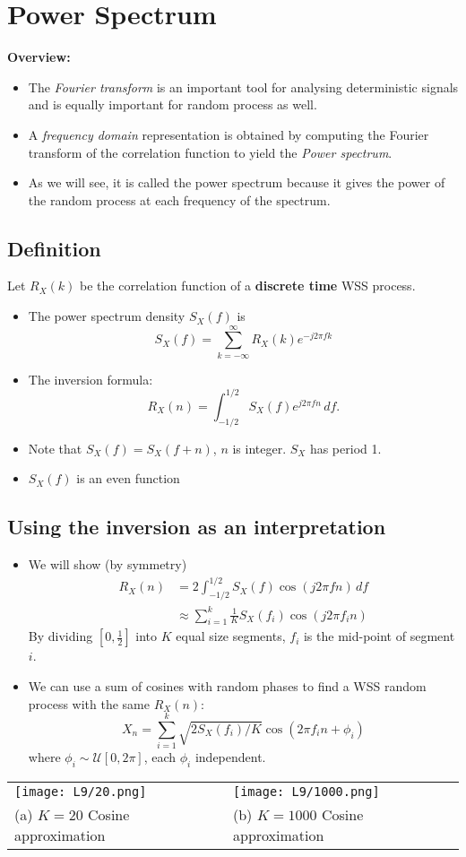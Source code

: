\documentclass[12pt]{article}
\newcommand{\inthalf}{\int_{-1/2}^{1/2}}
\newcommand{\intzerohalf}{\int_{-1/2}^{1/2}}
\newcommand{\summ}[2]{\sum_{#1}^{#2}}
\newcommand{\sumkinfinf}{\summ{k=-\infty}{\infty}}
\newcommand{\psd}{S_X(f)}
\newcommand{\corr}{R_X(k)}
\newcommand{\correlation}[1]{R_X(#1)}
\newcommand{\focoef}[1]{e^{-j2\pi f #1}}
\newcommand{\focoefinv}[1]{e^{j2\pi f #1}}
\begin{document}
\section{Power Spectrum}
\textbf{Overview:}
\begin{itemize}
    \item The \textit{Fourier transform} is an important tool for analysing deterministic signals and is equally important for random process as well.
    \item A \textit{frequency domain} representation is obtained by computing the Fourier transform of the correlation function to yield the \textit{Power spectrum}.
    \item As we will see, it is called the power spectrum because it gives the power of the random process at each frequency of the spectrum.
\end{itemize}
\subsection{Definition}
Let $R_X(k)$ be the correlation function of a \textbf{discrete time} WSS process. 
\begin{itemize}
    \item The power spectrum density $S_X(f)$ is 
\[
S_X(f) =\sumkinfinf \corr \focoef{k}
\]
\item The inversion formula:
\[
\correlation{n} = \inthalf \psd \focoefinv{n} \, df.
\]
\item Note that $\psd = S_X(f+n)$, $n$ is integer. $S_X$ has period 1.
\item $\psd$ is an even function
\end{itemize}
\subsection{Using the inversion as an interpretation}
\begin{itemize}
    \item We will show (by symmetry)
    \begin{align*}
        \correlation{n} &= 2 \intzerohalf \psd \cos(j2\pi f n )\, df \\
        & \approx \summ{i=1}{k}\frac{1}{K}S_X(f_i) \cos(j2\pi f_i n )
    \end{align*}
    By dividing $[0,\frac{1}{2}]$ into $K$ equal size segments, $f_i$ is the mid-point of segment $i$.
    \item We can use a sum of cosines with random phases to find a WSS random process with the same $\correlation{n}$:
    \[
    X_n = \summ{i=1}{k}\sqrt{2S_X(f_i)/K}\cos(2\pi f_i n + \phi_i)
    \]
    where $\phi_i \sim \mathcal{U}[0, 2\pi]$, each $\phi_i$ independent.
    
\end{itemize}
\begin{tabular}{ll}
\texttt{[image: L9/20.png]}
&\texttt{[image: L9/1000.png]} \\
(a) $K=20$ Cosine approximation & (b) $K=1000$ Cosine approximation
\end{tabular}
\end{document}
